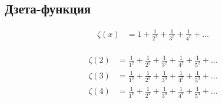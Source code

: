 \subsection{Дзета-функция} %

\begin{equation*}
\begin{aligned}
\zeta(x) &= 1 + \frac{1}{2^x} + \frac{1}{3^x} + \frac{1}{4^x} + \ldots \\
\end{aligned}
\end{equation*}

\begin{equation*}
\begin{aligned}
\zeta(2) &= 
  \frac{1}{1^2}
+ \frac{1}{2^2} 
+ \frac{1}{3^2} 
+ \frac{1}{4^2}
+ \frac{1}{5^2} 
+ \ldots 
\\
\zeta(3) &= 
  \frac{1}{1^3}
+ \frac{1}{2^3} 
+ \frac{1}{3^3} 
+ \frac{1}{4^3}
+ \frac{1}{5^3} 
+ \ldots 
\\
\zeta(4) &= 
  \frac{1}{1^4}
+ \frac{1}{2^4} 
+ \frac{1}{3^4} 
+ \frac{1}{4^4}
+ \frac{1}{5^4} 
+ \ldots 
\\
\end{aligned}
\end{equation*}
